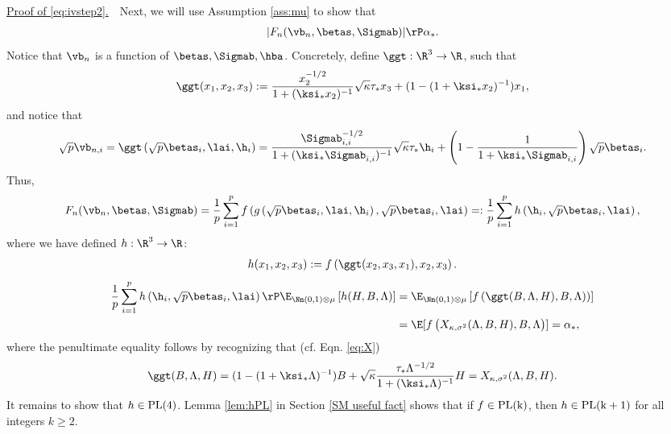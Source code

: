 \vspace{2pt}
\noindent\underline{Proof of \eqref{eq:ivstep2}.}~~Next, we will use Assumption \ref{ass:mu} to show that 
\begin{align}
|F_n(\vb_n,\betas,\Sigmab)| \rP \alpha_*.\label{eq:AO_conv}
\end{align}
Notice that $\vb_n$ is a function of $\betas,\Sigmab,\hba$. Concretely, define ${\ggt}:\R^3\rightarrow\R$, such that
$$
\ggt(x_1,x_2,x_3) := \frac{x_2^{-1/2}}{1+(\ksi_* x_2)^{-1}}\sqrt{\kappa}\tau_* x_3 + (1-(1+\ksi_*x_2)^{-1})x_1,
$$
and notice that
$$
\sqrt{p}\vb_{n,i} = \ggt\left(\sqrt{p}\betas_i,\lai,\h_i\right) = \frac{{\Sigmab_{i,i}^{-1/2}}}{1+(\ksi_*\Sigmab_{i,i})^{-1}}\sqrt{\kappa}\tau_*\h_i +\left(1-\frac{1}{1+\ksi_*\Sigmab_{i,i}}\right)\sqrt{p}\betas_i.
$$
Thus,
$$
F_n(\vb_n,\betas,\Sigmab) = \frac{1}{p}\sum_{i=1}^p f\left(g\left(\sqrt{p}\betas_i,\lai,\h_i\right),\sqrt{p}\betas_i,\lai\right) =: \frac{1}{p}\sum_{i=1}^p h\left(\h_i,\sqrt{p}\betas_i,\lai\right),
$$
where we have defined $h:\R^3\rightarrow\R$:
\begin{align}
h(x_1,x_2,x_3) := f\left(\ggt(x_2,x_3,x_1),x_2,x_3\right).\label{h func}
\end{align}
\begin{align}
\frac{1}{p}\sum_{i=1}^p h\left(\h_i,\sqrt{p}\betas_i,\lai\right) \rP \E_{\Nn(0,1)\otimes \mu}\left[h(H,B,\Lambda)\right] &=  \E_{\Nn(0,1)\otimes \mu}\left[f\left(\ggt(B,\Lambda,H),B,\Lambda\right))\right]\\
& = \E[f\left(X_{\kappa,\sigma^2}(\Lambda,B,H),B,\Lambda\right)] = \alpha_*,
\end{align}
where the penultimate equality follows by recognizing that (cf. Eqn. \eqref{eq:X})
$$
\ggt(B,\Lambda,H) = (1-(1+\ksi_*\Lambda)^{-1})B + \sqrt{\kappa}\frac{\tau_*\Lambda^{-1/2}}{1+(\ksi_*\Lambda)^{-1}}H =  X_{\kappa,\sigma^2}(\Lambda,B,H).
$$
It remains to show that $h\in\rm{PL}(4)$. Lemma \ref{lem:hPL} in Section \ref{SM useful fact} shows that if $f\in\rm{PL}(k)$, then $h\in\rm{PL}(k+1)$ for all integers $k\geq 2$. 

